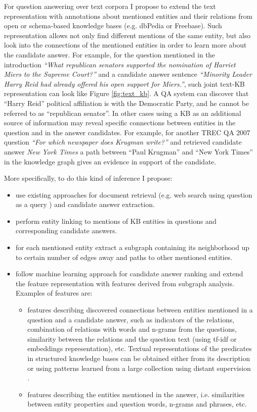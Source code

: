 For question answering over text corpora I propose to extend the text representation with annotations about mentioned entities and their relations from open \cite{Fader:2014:OQA:2623330.2623677} or schema-based knowledge bases (e.g. dbPedia or Freebase).
Such representation allows not only find different mentions of the same entity, but also look into the connections of the mentioned entities in order to learn more about the candidate answer.
For example, for the question mentioned in the introduction \textit{``What republican senators supported the nomination of Harriet Miers to the Supreme Court?''} and a candidate answer sentence \textit{``Minority Leader Harry Reid had already offered his open support for Miers.''}, such joint text-KB representation can look like Figure \ref{fig:text_kb}.
A QA system can discover that ``Harry Reid'' political affiliation is with the Democratic Party, and he cannot be referred to as ``republican senator''.
In other cases using a KB as an additional source of information may reveal specific connections between entities in the question and in the answer candidates.
For example, for another TREC QA 2007 question \textit{``For which newspaper does Krugman write?''} and retrieved candidate answer \textit{New York Times} a path between ``Paul Krugman'' and ``New York Times'' in the knowledge graph gives an evidence in support of the candidate.

More specifically, to do this kind of inference I propose:
\begin{itemize}
\item use existing approaches for document retrieval (e.g. web search using question as a query \cite{tsai2015web}) and candidate answer extraction.
\item perform entity linking to mentions of KB entities in questions and corresponding candidate answers.
\item for each mentioned entity extract a subgraph containing its neighborhood up to certain number of edges away and paths to other mentioned entities.
\item follow machine learning approach for candidate answer ranking and extend the feature representation with features derived from subgraph analysis. Examples of features are:
	\begin{itemize}
	\item features describing discovered connections between entities mentioned in a question and a candidate answer, such as indicators of the relations, combination of relations with words and n-grams from the questions, similarity between the relations and the question text (using tf-idf or embeddings representation), etc. Textual representations of the predicates in structured knowledge bases can be obtained either from its description or using patterns learned from a large collection using distant supervision \cite{MintzBSJ09}.
	\item features describing the entities mentioned in the answer, i.e. similarities between entity properties and question words, n-grams and phrases, etc.
	\end{itemize}
\end{itemize}


